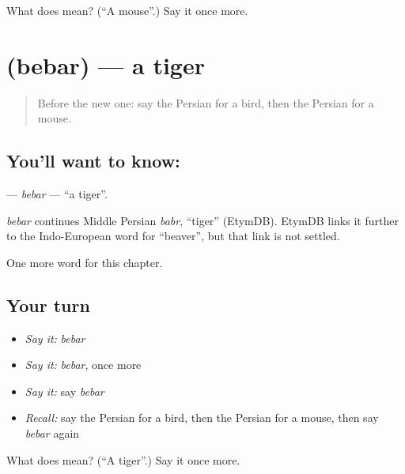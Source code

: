 \begin{tcolorbox}[breakable,colback=teal!4,colframe=teal!35!black,title={Before you move on}]
What does  mean? (\textquotedblleft{}A mouse\textquotedblright{}.) Say it once more.
\end{tcolorbox}
\section[\texorpdfstring{\fa{ببر} (bebar)}{ببر (bebar)}]{ (bebar) — a tiger}

\label{lesson:FA-C56-bebar}



\begin{quote}
Before the new one: say the Persian for a bird, then the Persian for a mouse.
\end{quote}

\subsection*{You'll want to know: }
\textbf{} — \emph{bebar} — \textquotedblleft{}a tiger\textquotedblright{}.

\begin{cousinweb}
\emph{bebar} continues Middle Persian \emph{babr}, \textquotedblleft{}tiger\textquotedblright{} (EtymDB). EtymDB links it further to the Indo-European word for \textquotedblleft{}beaver\textquotedblright{}, but that link is not settled.
\end{cousinweb}

\begin{grammarlens}[title={What you've built}]
One more word for this chapter.
\end{grammarlens}

\subsection*{Your turn}
\begin{itemize}
\raggedright
  \item \emph{Say it:} \emph{bebar}
  \item \emph{Say it:} \emph{bebar}, once more
  \item \emph{Say it:} say \emph{bebar}
  \item \emph{Recall:} say the Persian for a bird, then the Persian for a mouse, then say \emph{bebar} again
\end{itemize}

\begin{tcolorbox}[breakable,colback=teal!4,colframe=teal!35!black,title={Before you move on}]
What does  mean? (\textquotedblleft{}A tiger\textquotedblright{}.) Say it once more.
\end{tcolorbox}
